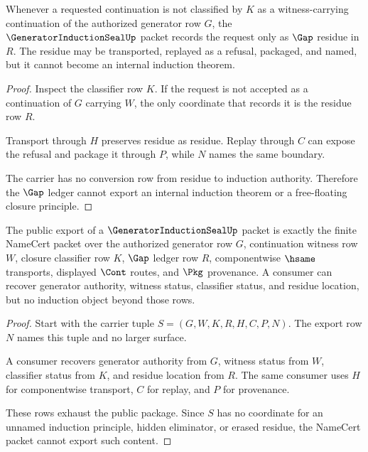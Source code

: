 \begin{theorem}
\label{thm:generator-induction-seal-gap-non-escape}
Whenever a requested continuation is not classified by $K$ as a witness-carrying continuation of the authorized generator row $G$, the $\GeneratorInductionSealUp$ packet records the request only as $\Gap$ residue in $R$. The residue may be transported, replayed as a refusal, packaged, and named, but it cannot become an internal induction theorem.
\end{theorem}
\begin{proof}
Inspect the classifier row $K$. If the request is not accepted as a continuation of $G$ carrying $W$, the only coordinate that records it is the residue row $R$.

Transport through $H$ preserves residue as residue. Replay through $C$ can expose the refusal and package it through $P$, while $N$ names the same boundary.

The carrier has no conversion row from residue to induction authority. Therefore the $\Gap$ ledger cannot export an internal induction theorem or a free-floating closure principle.
\end{proof}

\begin{theorem}
\label{thm:generator-induction-seal-public-package}
The public export of a $\GeneratorInductionSealUp$ packet is exactly the finite NameCert packet over the authorized generator row $G$, continuation witness row $W$, closure classifier row $K$, $\Gap$ ledger row $R$, componentwise $\hsame$ transports, displayed $\Cont$ routes, and $\Pkg$ provenance. A consumer can recover generator authority, witness status, classifier status, and residue location, but no induction object beyond those rows.
\end{theorem}
\begin{proof}
Start with the carrier tuple $S=(G,W,K,R,H,C,P,N)$. The export row $N$ names this tuple and no larger surface.

A consumer recovers generator authority from $G$, witness status from $W$, classifier status from $K$, and residue location from $R$. The same consumer uses $H$ for componentwise transport, $C$ for replay, and $P$ for provenance.

These rows exhaust the public package. Since $S$ has no coordinate for an unnamed induction principle, hidden eliminator, or erased residue, the NameCert packet cannot export such content.
\end{proof}

